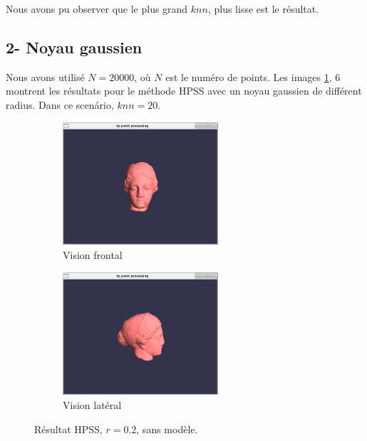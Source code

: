 \documentclass[a4,12pt]{report}
\begin{document}
Nous avons pu observer que le plus grand $knn$, plus lisse est le résultat. 

\pagebreak[4]
\subsection*{2- Noyau gaussien}

Nous avons utilisé $N=20000$, où $N$ est le numéro de points. Les images \ref{fig:3}, 6 montrent les résultats pour le méthode HPSS avec un noyau gaussien de différent radius. Dans ce scenário, $knn=20$.


\begin{figure}[!h]
	\centering
	\begin{subfigure}[b]{0.5\textwidth}
		\centering
		\includegraphics[height=1.8in]{figs/caso2-knn20-frontal-sem.png}
		\caption{Vision frontal}
	\end{subfigure}%
	\begin{subfigure}[b]{0.5\textwidth}
		\centering
		\includegraphics[height=1.8in]{figs/caso2-knn20-lateral-sem.png}
		\caption{Vision latéral}
	\end{subfigure}
	\caption{Résultat HPSS, $r=0.2$,  sans modèle.}
	\label{fig:3}
\end{figure}
\end{document}
